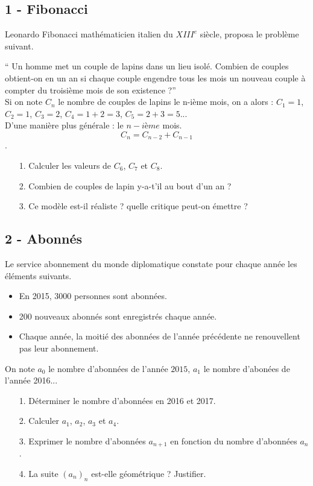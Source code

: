 \documentclass[12pt]{article}
\begin{document}
\begin{multicols}{2}
\subsection*{1 - Fibonacci}

Leonardo Fibonacci mathématicien italien du $XIII^e$ siècle, proposa le problème suivant.

`` Un homme met un couple de lapins dans un lieu isolé. Combien de couples obtient-on en un an si chaque couple engendre tous les mois un nouveau couple à compter du troisième mois de son existence ?''\\

Si on note $C_n$ le nombre de couples de lapins le n-ième mois, on a alors : $C_1 = 1$, $C_2 = 1$, $C_3 = 2$, $C_4 = 1 + 2 = 3$, $C_5 = 2 + 3 = 5$...\\
D'une manière plus générale : le $n-ième$ mois.
$$C_n = C_{n-2} + C_{n-1}$$.

\begin{enumerate}
\item[1.] Calculer les valeurs de $C_6$, $C_7$ et $C_8$.
\item[2.] Combien de couples de lapin y-a-t'il au bout d'un an ?
\item[3.] Ce modèle est-il réaliste ? quelle critique peut-on émettre ?
\end{enumerate}

\noindent\hrulefill

\subsection*{2 - Abonnés}

Le service abonnement du monde diplomatique constate pour chaque année les éléments suivants.

\begin{itemize}
\item En 2015, $3000$ personnes sont abonnées.
\item 200 nouveaux abonnés sont enregistrés chaque année.
\item Chaque année, la moitié des abonnées de l’année précédente ne renouvellent pas leur abonnement.
\end{itemize}
On note $a_0$ le nombre d’abonnées de l’année $2015$, $a_1$ le nombre d'abonées de l'année 2016...

\begin{enumerate}
\item[1.] Déterminer le nombre d’abonnées en 2016 et 2017.
\item[2.] Calculer $a_1$,  $a_2$,  $a_3$ et  $a_4$.
\item[3.] Exprimer le nombre d’abonnées $a_{n+1}$ en fonction du nombre d’abonnées $a_n$.
\item[4.] La suite $(a_n)_n$ est-elle géométrique ? Justifier.
\end{enumerate}


\end{multicols}
\end{document}
